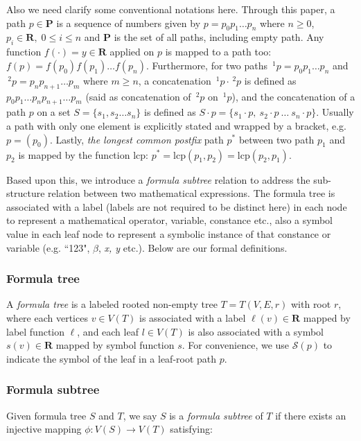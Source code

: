 Also we need clarify some conventional notations here. 
Through this paper, a path $p \in \mathbf{P}$ is a sequence of numbers given by $p = p_0 p_1 \ldots p_n$ where $n\ge0$, $p_i \in \mathbf{R},\; 0 \le i \le n$ and $\mathbf{P}$ is the set of all paths, including empty path. 
Any function $f(\cdot) = y \in \mathbf{R}$ applied on $p$ is mapped to a path too: $f(p)=f(p_0)f(p_1) \ldots f(p_n)$. 
Furthermore, for two paths $\,^1p = p_0p_1 \ldots p_n$ and $\,^2p = p_np_{n+1} \ldots p_m$ where $m \ge n$, a concatenation $\,^1p \cdot \,^2p$ is defined as $p_0p_1 \ldots p_n p_{n+1} \ldots p_m$ (said as concatenation of $\,^2p$ on $\,^1p$), 
and the concatenation of a path $p$ on a set $S = \{ s_1, s_2 \ldots s_n \}$ is defined as $S \cdot p = \{ s_1\cdot p,\  s_2\cdot p \ \ldots \ s_n\cdot p \}$. 
Usually a path with only one element is explicitly stated and wrapped by a bracket, e.g. $p=(p_0)$. 
Lastly, \textit{the longest common postfix} path $p^*$ between two path $p_1$ and $p_2$ is mapped by the function $\mathrm{lcp}$: $p^* = \mathrm{lcp}(p_1, p_2) = \mathrm{lcp}(p_2, p_1)$.

Based upon this,  we introduce a \textit{formula subtree} relation to address the sub-structure relation between two mathematical expressions. 
The formula tree is associated with a label (labels are not required to be distinct here) in each node to represent a mathematical operator, variable, constance etc., also a symbol value in each leaf node to represent a symbolic instance of that constance or variable (e.g. ``123", $\beta$, \textit{x, y} etc.). 
Below are our formal definitions.

\subsubsection{Formula tree}
A \textit{formula tree} is a labeled rooted non-empty tree $T = T(V,E,r)$ with root $r$, where each vertices $v \in V(T)$ is associated with a label $\ell(v) \in \mathbf{R}$ mapped by label function $\ell$, and each leaf $l \in V(T)$ is also associated with a symbol $s(v) \in \mathbf{R}$ mapped by symbol function $s$. For convenience, we use $\mathcal{S}(p)$ to indicate the symbol of the leaf in a leaf-root path $p$.

\subsubsection{Formula subtree}
\label{frmlsubtreeDef}
Given formula tree $S$ and $T$, we say $S$ is a \textit{formula subtree} of $T$ if there exists an injective mapping $\phi: V(S) \rightarrow V(T)$ satisfying:

